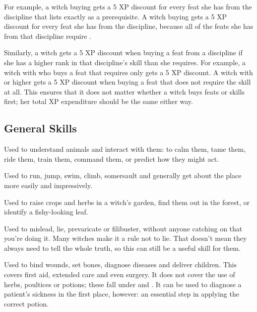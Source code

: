 For example, a witch buying  gets a 5 XP discount for every feat she has from the  discipline that lists exactly  as a prerequisite.
A witch buying  gets a 5 XP discount for every feat she has from the  discipline, because all of the feats she has from that discipline require .

Similarly, a witch gets a 5 XP discount when buying a feat from a discipline if she has a higher rank in that discipline's skill than she requires.
For example, a witch with  who buys a  feat that requires only  gets a 5 XP discount.
A witch with  or higher gets a 5 XP discount when buying a  feat that does not require the  skill at all.
This ensures that it does not matter whether a witch buys feats or skills first; her total XP expenditure should be the same either way.

\subsection{General Skills}


Used to understand animals and interact with them: to calm them, tame them, ride them, train them, command them, or predict how they might act.


Used to run, jump, swim, climb, somersault and generally get about the place more easily and impressively.


Used to raise crops and herbs in a witch's garden, find them out in the forest, or identify a fishy-looking leaf.


Used to mislead, lie, prevaricate or filibuster, without anyone catching on that you're doing it.
Many witches make it a rule not to lie.
That doesn't mean they always need to tell the whole truth, so this can still be a useful skill for them.


Used to bind wounds, set bones, diagnose diseases and deliver children.
This covers first aid, extended care and even surgery.
It does not cover the use of herbs, poultices or potions; these fall under  and .
It can be used to diagnose a patient's sickness in the first place, however: an essential step in applying the correct potion.

